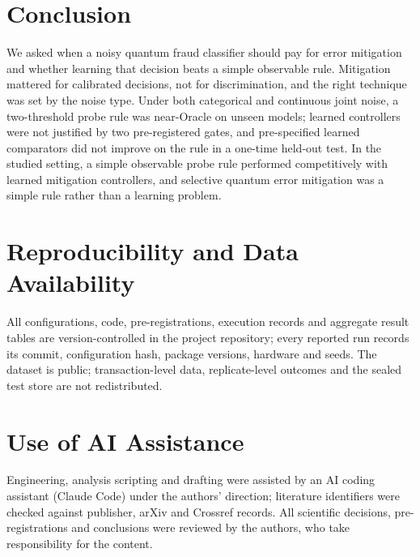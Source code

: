 \documentclass[11pt]{article}
\begin{document}
\section{Conclusion}

We asked when a noisy quantum fraud classifier should pay for error mitigation and whether learning that decision beats a simple observable rule.
Mitigation mattered for calibrated decisions, not for discrimination, and the right technique was set by the noise type.
Under both categorical and continuous joint noise, a two-threshold probe rule was near-Oracle on unseen models; learned controllers were not justified by two pre-registered gates, and pre-specified learned comparators did not improve on the rule in a one-time held-out test.
In the studied setting, a simple observable probe rule performed competitively with learned mitigation controllers, and selective quantum error mitigation was a simple rule rather than a learning problem.

\section*{Reproducibility and Data Availability}
All configurations, code, pre-registrations, execution records and aggregate result tables are version-controlled in the project repository; every reported run records its commit, configuration hash, package versions, hardware and seeds.
The dataset is public; transaction-level data, replicate-level outcomes and the sealed test store are not redistributed.

\section*{Use of AI Assistance}
Engineering, analysis scripting and drafting were assisted by an AI coding assistant (Claude Code) under the authors' direction; literature identifiers were checked against publisher, arXiv and Crossref records.
All scientific decisions, pre-registrations and conclusions were reviewed by the authors, who take responsibility for the content.



\end{document}

